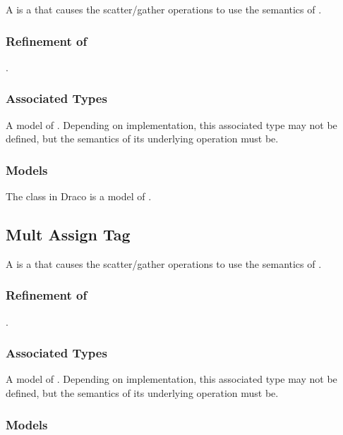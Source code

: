 \documentclass[note]{newmemo}
\begin{document}
A  is a  that
causes the  scatter/gather operations to use
the semantics of .

\subsubsection{Refinement of}
.

\subsubsection{Associated Types}

A model of . Depending on implementation, this
associated type may not be defined, but the semantics of its
underlying operation must be.

\subsubsection{Models}

The  class in Draco is a model of
.

\newpage

\subsection{Mult Assign Tag}

A  is a  that
causes the  scatter/gather operations to use
the semantics of .

\subsubsection{Refinement of}
.

\subsubsection{Associated Types}

A model of . Depending on implementation, this
associated type may not be defined, but the semantics of its
underlying operation must be.

\subsubsection{Models}
\end{document}
